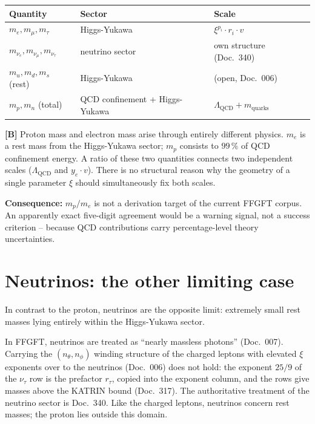 \begin{center}
\begin{tabular}{lll}
\toprule
Quantity & Sector & Scale \\
\midrule
$m_e, m_\mu, m_\tau$ & Higgs-Yukawa & $\xi^{p_i} \cdot r_i \cdot v$ \\
$m_{\nu_e}, m_{\nu_\mu}, m_{\nu_\tau}$ & neutrino sector & own structure (Doc.~340) \\
$m_u, m_d, m_s$ (rest) & Higgs-Yukawa & (open, Doc.~006) \\
$m_p, m_n$ (total) & QCD confinement + Higgs-Yukawa
  & $\Lambda_{\mathrm{QCD}} + m_{\mathrm{quarks}}$ \\
\bottomrule
\end{tabular}
\end{center}

\textbf{[B]} Proton mass and electron mass arise through entirely
different physics. $m_e$ is a rest mass from the Higgs-Yukawa sector;
$m_p$ consists to $99\,\%$ of QCD confinement energy. A ratio of these
two quantities connects two independent scales ($\Lambda_{\mathrm{QCD}}$
and $y_e \cdot v$). There is no structural reason why the geometry of a
single parameter $\xi$ should simultaneously fix both scales.

\textbf{Consequence:} $m_p/m_e$ is not a derivation target of the
current FFGFT corpus. An apparently exact five-digit agreement would be
a warning signal, not a success criterion -- because QCD contributions
carry percentage-level theory uncertainties.

\section{Neutrinos: the other limiting case}

In contrast to the proton, neutrinos are the opposite limit: extremely
small rest masses lying entirely within the Higgs-Yukawa sector.

In FFGFT, neutrinos are treated as ``nearly massless photons''
(Doc.~007). Carrying the $(n_\theta, n_\phi)$ winding structure of the
charged leptons with elevated $\xi$ exponents over to the neutrinos
(Doc.~006) does not hold: the exponent $25/9$ of the $\nu_\tau$ row is
the prefactor $r_\tau$, copied into the exponent column, and the rows
give masses above the KATRIN bound (Doc.~317). The authoritative
treatment of the neutrino sector is Doc.~340. Like the charged leptons,
neutrinos concern rest masses; the proton lies outside this domain.



